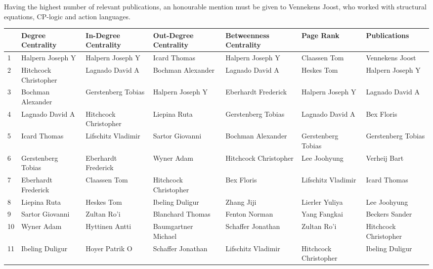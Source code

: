 \documentclass[11pt,a4paper]{book}
\theoremstyle{definition}
\theoremstyle{definition}
\theoremstyle{definition}
\theoremstyle{remark}
\begin{document}
Having the highest number of relevant publications, an honourable mention must be given to Vennekens Joost, who worked with structural equations, CP-logic and action languages. 
\begin{table}
\centering
\scriptsize
\begin{tabular}{lllllll}
\toprule
{} &     Degree Centrality &    In-Degree Centrality &   Out-Degree Centrality &  Betweenness Centrality &   Page Rank & Publications \\
\midrule
1  &       Halpern Joseph Y &       Halpern Joseph Y &           Icard Thomas &       Halpern Joseph Y &           Claassen Tom &        Vennekens Joost \\
2  &  Hitchcock Christopher &        Lagnado David A &      Bochman Alexander &        Lagnado David A &             Heskes Tom &       Halpern Joseph Y \\
3  &      Bochman Alexander &     Gerstenberg Tobias &       Halpern Joseph Y &    Eberhardt Frederick &       Halpern Joseph Y &        Lagnado David A \\
4  &        Lagnado David A &  Hitchcock Christopher &           Liepina Ruta &     Gerstenberg Tobias &        Lagnado David A &             Bex Floris \\
5  &           Icard Thomas &     Lifschitz Vladimir &        Sartor Giovanni &      Bochman Alexander &     Gerstenberg Tobias &     Gerstenberg Tobias \\
6  &     Gerstenberg Tobias &    Eberhardt Frederick &             Wyner Adam &  Hitchcock Christopher &           Lee Joohyung &           Verheij Bart \\
7  &    Eberhardt Frederick &           Claassen Tom &  Hitchcock Christopher &             Bex Floris &     Lifschitz Vladimir &           Icard Thomas \\
8  &           Liepina Ruta &             Heskes Tom &        Ibeling Duligur &             Zhang Jiji &         Lierler Yuliya &           Lee Joohyung \\
9  &        Sartor Giovanni &            Zultan Ro'i &       Blanchard Thomas &          Fenton Norman &           Yang Fangkai &         Beckers Sander \\
10  &             Wyner Adam &         Hyttinen Antti &    Baumgartner Michael &      Schaffer Jonathan &            Zultan Ro'i &  Hitchcock Christopher \\
11 &        Ibeling Duligur &         Hoyer Patrik O &      Schaffer Jonathan &     Lifschitz Vladimir &  Hitchcock Christopher &        Ibeling Duligur \\

\end{tabular}
\end{table}
\end{document}
